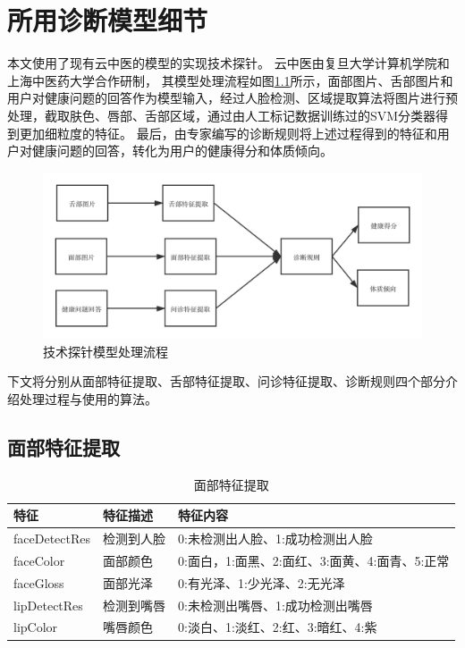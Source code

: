 \appendix
\appendixpage
\addappheadtotoc
\chapter{所用诊断模型细节}
\label{ch:appendix}

本文使用了现有云中医的模型的实现技术探针。
云中医由复旦大学计算机学院和上海中医药大学合作研制，
其模型处理流程如图\ref{fig:cloudmed2}所示，面部图片、舌部图片和用户对健康问题的回答作为模型输入，经过人脸检测、区域提取算法将图片进行预处理，截取肤色、唇部、舌部区域，通过由人工标记数据训练过的SVM分类器得到更加细粒度的特征。
最后，由专家编写的诊断规则将上述过程得到的特征和用户对健康问题的回答，转化为用户的健康得分和体质倾向。

\begin{figure}[htb]
    \centering
    \includegraphics[width=15cm]{images/cloud_med3.png}
    \caption{技术探针模型处理流程}
    \label{fig:cloudmed2}
\end{figure}

下文将分别从面部特征提取、舌部特征提取、问诊特征提取、诊断规则四个部分介绍处理过程与使用的算法。

\section{面部特征提取}
\label{subsec:face_feature}

\begin{table}[h]
    \centering
    \caption{面部特征提取}
    \begin{tabular}{lll}
        \toprule
        特征          & 特征描述     & 特征内容 \\
        \midrule
        faceDetectRes & 检测到人脸   & 0:未检测出人脸、1:成功检测出人脸  \\
        faceColor     & 面部颜色 & 0:面白，1:面黑、2:面红、3:面黄、4:面青、5:正常 \\
        faceGloss     & 面部光泽 & 0:有光泽、1:少光泽、2:无光泽\\
        lipDetectRes  & 检测到嘴唇   & 0:未检测出嘴唇、1:成功检测出嘴唇\\
        lipColor      & 嘴唇颜色 & 0:淡白、1:淡红、2:红、3:暗红、4:紫   \\
        \bottomrule
    \end{tabular}
    \label{tab:face-feature}
\end{table}

